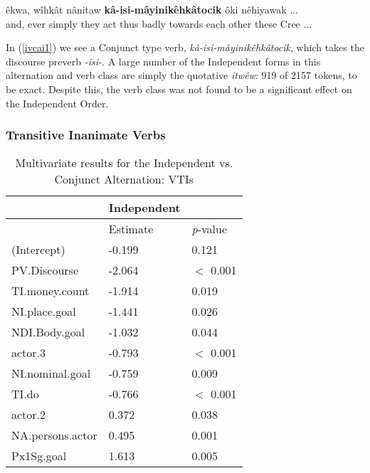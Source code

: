 \begin{exe}
\ex
\gll êkwa, wîhkât nânitaw \textbf{kâ-isi-mâyinikêhkâtocik} ôki nêhiyawak ... \\
     and, ever simply {they act thus badly towards each other} these Cree ...  \\
\trans
\label{ivcai1}
\end{exe}

In (\ref{ivcai1}) we see a Conjunct type verb, \textit{kâ-isi-mâyinikêhkâtocik}, which takes the discourse preverb \textit{-isi-}. A large number of the Independent forms in this alternation and verb class are simply the quotative \textit{itwêw}: 919 of 2157 tokens, to be exact. Despite this, the verb class  was not found to be a significant effect on the Independent Order.

    \subsubsection{Transitive Inanimate Verbs}
            \begin{table}[H]
            \centering
            \begin{tabular}{lll}
            \toprule
            & \textbf{Independent} & \\
                    \midrule
            & Estimate & \textit{p}-value \\
    \midrule
(Intercept)      & -0.199 & 0.121 \\
PV.Discourse     & -2.064 & $<$ 0.001 \\
TI.money.count   & -1.914 & 0.019 \\
NI.place.goal    & -1.441 & 0.026 \\
NDI.Body.goal    & -1.032 & 0.044 \\
actor.3          & -0.793 & $<$ 0.001 \\
NI.nominal.goal  & -0.759 & 0.009 \\
TI.do            & -0.766 & $<$ 0.001 \\
actor.2          & 0.372  & 0.038 \\
NA.persons.actor & 0.495  & 0.001 \\
Px1Sg.goal       & 1.613  & 0.005 \\
            \bottomrule
            \end{tabular}
            \caption{
               Multivariate results for the Independent vs. Conjunct Alternation: VTIs \\ \label{tab:tiivcmv}
              }
            \end{table}
        
